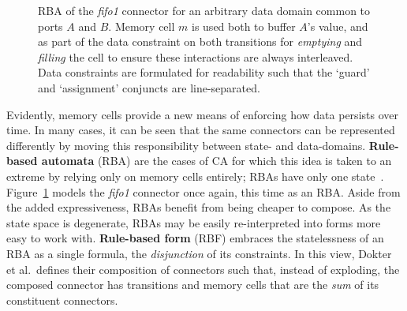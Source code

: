 \begin{figure}[ht]
	\centering
	\caption[RBA for fifo1 connector.]{RBA of the \textit{fifo1} connector for an arbitrary data domain common to ports $A$ and $B$. Memory cell $m$ is used both to buffer $A$'s value, and as part of the data constraint on both transitions for \textit{emptying} and \textit{filling} the cell to ensure these interactions are always interleaved. Data constraints are formulated for readability such that the `guard' and `assignment' conjuncts are line-separated.}
	\label{fig:fifo1_rba}
\end{figure}
Evidently, memory cells provide a new means of enforcing how data persists over time. In many cases, it can be seen that the same connectors can be represented differently by moving this responsibility between state- and data-domains. \textbf{Rule-based automata} (RBA) are the cases of CA for which this idea is taken to an extreme by relying only on memory cells entirely; RBAs have only one state~\cite{dokter2018rule}. Figure~\ref{fig:fifo1_rba} models the \textit{fifo1} connector once again, this time as an RBA. Aside from the added expressiveness, RBAs benefit from being cheaper to compose. As the state space is degenerate, RBAs may be easily re-interpreted into forms more easy to work with. \textbf{Rule-based form} (RBF) embraces the statelessness of an RBA as a single formula, the \textit{disjunction} of its constraints. In this view, Dokter et al.\ defines their composition of connectors such that, instead of exploding, the composed connector has transitions and memory cells that are the \textit{sum} of its constituent connectors.



